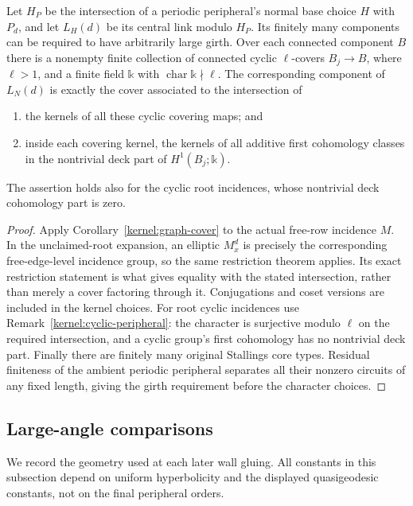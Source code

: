 \begin{lemma}\label{fan:cover-data}
Let $H_P$ be the intersection of a periodic peripheral's normal base
choice $H$ with $P_d$, and let $L_H(d)$ be its central link modulo
$H_P$.  Its finitely many components can be required to have
arbitrarily large girth.  Over each connected component $B$ there is a
nonempty finite collection of connected cyclic $\ell$-covers
$B_j\to B$, where $\ell>1$, and a finite field $\mathbb k$ with
$\operatorname{char}\mathbb k\nmid\ell$.  The corresponding component
of $L_N(d)$ is exactly the cover associated to the intersection of
\begin{enumerate}[label=\textup{(\roman*)}]
\item the kernels of all these cyclic covering maps; and
\item inside each covering kernel, the kernels of all additive first
cohomology classes in the nontrivial deck part of
$H^1(B_j;\mathbb k)$.
\end{enumerate}
The assertion holds also for the cyclic root incidences, whose
nontrivial deck cohomology part is zero.
\end{lemma}

\begin{proof}
Apply Corollary~\ref{kernel:graph-cover} to the actual free-row incidence
$M$.  In the unclaimed-root expansion, an elliptic $M_x^d$ is precisely
the corresponding free-edge-level incidence group, so the same
restriction theorem applies.  Its exact restriction statement is what
gives equality with the stated intersection, rather than merely a
cover factoring through it.  Conjugations and coset versions are
included in the kernel choices.  For root cyclic incidences use
Remark~\ref{kernel:cyclic-peripheral}: the character is surjective
modulo $\ell$ on the required intersection, and a cyclic group's first
cohomology has no nontrivial deck part.  Finally there are finitely many
original Stallings core types.  Residual finiteness of the ambient
periodic peripheral separates all their nonzero circuits of any fixed
length, giving the girth requirement before the character choices.
\end{proof}

\subsection{Large-angle comparisons}

We record the geometry used at each later wall gluing.  All constants
in this subsection depend on uniform hyperbolicity and the displayed
quasigeodesic constants, not on the final peripheral orders.

